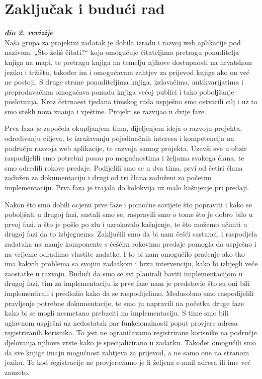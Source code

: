 \chapter{Zaključak i budući rad}
		
		\textbf{\textit{dio 2. revizije}}\\
		
		 Naša grupa za projektni zadatak je dobila izradu i razvoj web aplikacije pod nazivom: „Što želiš čitati?“  koja omogućuje čitateljima pretragu ponuditelja knjiga na mapi, te pretragu knjiga na temelju njihove dostupnosti na hrvatskom jeziku i tržištu, također im i omogućavam zahtjev za prijevod knjige ako on već ne postoji. S druge strane ponuditeljima knjiga, izdavačima, antikvarijatima i preprodavačima omogućava ponudu knjiga većoj publici i tako poboljšanje poslovanja. Kroz četrnaest tjedana timskog rada uspješno smo ostvarili cilj i uz to smo stekli nova znanja i vještine. Projekt se razvijao u dvije faze. 
		
		 Prva faza je započela okupljanjem tima, dijeljenjem ideja o razvoju projekta, određivanju ciljeva, te izražavanju pojedinačnih interesa i kompetencija na području razvoja web aplikacije, te razvoja samog projekta. Uzevši sve u obzir raspodijelili smo potrebni posao po mogućnostima i željama svakoga člana, te smo odredili rokove predaje. Podijelili smo se u dva tima, prvi od četiri člana zadužen za dokumentaciju i drugi od tri člana zaduženi za početnu implementaciju. Prva faza je trajala do kolokvija uz malo kašnjenje pri predaji.
   
          Nakon što smo dobili ocjenu prve faze i pomoćne savijete što popraviti i kako se poboljšati u drugoj fazi, sastali smo se, raspravili smo o tome što je dobro bilo u prvoj fazi, a što je pošlo po zlu i uzrokovalo kašnjenje, te što možemo učiniti u drugoj fazi da to izbjegnemo. Zaključili smo da bi nam češći sastanci, i raspodjela zadataka na manje komponente s češćim rokovima predaje pomogla da uspješno i na vrijeme odradimo vlastite zadatke. I to bi nam omogućilo praćenje ako tko ima kakvih problema sa svojim zadatkom i brzu intervenciju, kako bi izbjegli veće zaostatke u razvoju.  Budući da smo se svi planirali baviti implementacijom u drugoj fazi, tim za implementaciju iz prve faze nam je predstavio što su oni bili implementirali i predložio kako da se raspodijelimo. Međusobno smo raspodijelili pravljenje potrebne dokumentacije, te smo ju napravili na početku druge faze kako bi se mogli nesmetano prebaciti na implementaciju.  S time smo bili uglavnom uspješni uz nedostatak par funkcionalnosti poput provjere adresa registriranih korisnika. To jest ne ograničavamo registrirane korisnike na područje djelovanja njihove vrste kako je specijalizirano u zadatku. Također omogućili smo da sve knjige imaju mogućnost zahtjeva za prijevod, a ne samo one na stranom jeziku.  Te kod registracije ne provjeravamo je li željena e-mail adresa ili ime već zauzeto.
          
